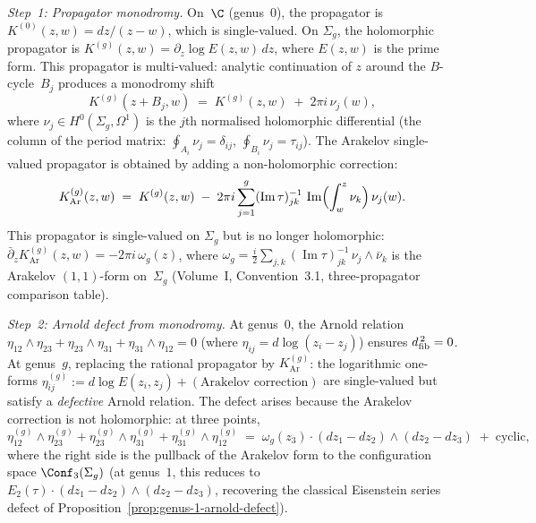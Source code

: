 \begin{construction}
\begin{enumerate}[label=\textup{(\roman*)}]
 \smallskip\noindent
 \emph{Step~1: Propagator monodromy.}
 On~$\C$ (genus~$0$), the propagator is
 $K^{(0)}(z,w) = dz/(z-w)$, which is single-valued. On
 $\Sigma_g$, the holomorphic propagator is
 $K^{(g)}(z,w) = \partial_z \log E(z,w)\,dz$,
 where $E(z,w)$ is the prime form. This propagator is
 multi-valued: analytic continuation of $z$ around the
 $B$-cycle~$B_j$ produces a monodromy shift
 \begin{equation}\label{eq:propagator-monodromy}
 K^{(g)}(z + B_j, w)
 \;=\;
 K^{(g)}(z,w)
 \;+\;
 2\pi i\, \nu_j(w),
 \end{equation}
 where $\nu_j \in H^0(\Sigma_g, \Omega^1)$ is the $j$th
 normalised holomorphic differential (the column of the period
 matrix: $\oint_{A_i} \nu_j = \delta_{ij}$,
 $\oint_{B_i} \nu_j = \tau_{ij}$). The Arakelov
 single-valued propagator is obtained by adding a
 non-holomorphic correction:
 \[
 K^{(g)}_{\mathrm{Ar}}(z,w)
 \;=\;
 K^{(g)}(z,w)
 \;-\;
 2\pi i \sum_{j=1}^g
 (\operatorname{Im}\tau)^{-1}_{jk}\,
 \operatorname{Im}\Bigl(\int_w^z \nu_k\Bigr)\, \nu_j(w).
 \]
 This propagator is single-valued on $\Sigma_g$ but is no longer
 holomorphic: $\bar\partial_z K^{(g)}_{\mathrm{Ar}}(z,w)
 = -2\pi i\, \omega_g(z)$, where $\omega_g = \frac{i}{2}
 \sum_{j,k} (\operatorname{Im}\tau)^{-1}_{jk}\,
 \nu_j \wedge \bar{\nu}_k$ is the Arakelov $(1,1)$-form
 on~$\Sigma_g$ (Volume~I, Convention~3.1, three-propagator
 comparison table).

 \smallskip\noindent
 \emph{Step~2: Arnold defect from monodromy.}
 At genus~$0$, the Arnold relation
 $\eta_{12} \wedge \eta_{23} + \eta_{23} \wedge \eta_{31}
 + \eta_{31} \wedge \eta_{12} = 0$
 (where $\eta_{ij} = d\log(z_i - z_j)$) ensures
 $d_{\mathrm{fib}}^{\,2} = 0$. At genus~$g$, replacing the rational
 propagator by $K^{(g)}_{\mathrm{Ar}}$: the logarithmic
 one-forms
 $\eta^{(g)}_{ij} := d\log E(z_i, z_j) +
 (\text{Arakelov correction})$ are single-valued but
 satisfy a \emph{defective} Arnold relation. The defect
 arises because the Arakelov correction is not holomorphic:
 at three points,
 \begin{equation}\label{eq:arnold-defect-genus-g}
 \eta^{(g)}_{12} \wedge \eta^{(g)}_{23}
 + \eta^{(g)}_{23} \wedge \eta^{(g)}_{31}
 + \eta^{(g)}_{31} \wedge \eta^{(g)}_{12}
 \;=\;
 \omega_g(z_3) \cdot
 (dz_1 - dz_2) \wedge (dz_2 - dz_3)
 \;+\; \text{cyclic},
 \end{equation}
 where the right side is the pullback of the Arakelov form to the
 configuration space $\Conf_3(\Sigma_g)$
 (at genus~$1$, this reduces to $E_2(\tau) \cdot (dz_1 - dz_2)
 \wedge (dz_2 - dz_3)$, recovering the classical Eisenstein
 series defect of
 Proposition~\ref{prop:genus-1-arnold-defect}).


\end{enumerate}
\end{construction}
